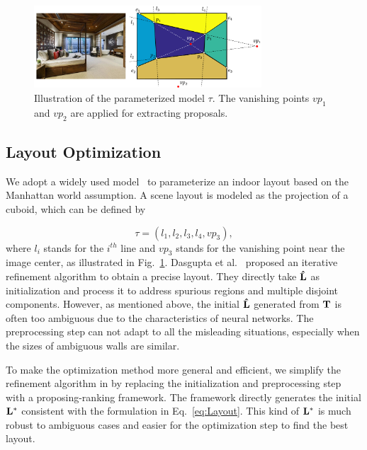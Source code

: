 \begin{figure}
	\centering
	\includegraphics[width=8.5cm]{figure/parameterization.png}
	\caption{ Illustration of the parameterized model $\tau$. The vanishing points $vp_1$ and $vp_2$ are applied for extracting proposals. }
	\label{fig:parameterization}
\end{figure}


\subsection{Layout Optimization}
\label{sec:optimization}
We adopt a widely used model~\cite{hedau2009recovering, wang2013discriminative, dasgupta2016delay, ren2016coarse} to parameterize an indoor layout based on the Manhattan world assumption. A scene layout is modeled as the projection of a cuboid, which can be defined by 

\begin{equation}
	\label{eq:Layout}
	\tau = (l_1, l_2, l_3, l_4, vp_3),
\end{equation}
%
where $l_{i}$ stands for the $i^{th}$ line and $vp_3$ stands for the vanishing point near the image center, as illustrated in Fig.~\ref{fig:parameterization}.
%
Dasgupta et al.~\cite{dasgupta2016delay} proposed an iterative refinement algorithm to obtain a precise layout. 
They directly take $\mathbf{\hat{L}}$ as initialization and process it to address spurious regions and multiple disjoint components. 
However, as mentioned above, the initial $\mathbf{\hat{L}}$ generated from $\mathbf{T}$ is often too ambiguous due to the characteristics of neural networks.
The preprocessing step can not adapt to all the misleading situations, especially when the sizes of ambiguous walls are similar. 

To make the optimization method more general and efficient, we simplify the refinement algorithm in \cite{dasgupta2016delay} by replacing the initialization and preprocessing step with a proposing-ranking framework. The framework directly generates the initial $\mathbf{L^*}$ consistent with the formulation in Eq.~\ref{eq:Layout}. This kind of $\mathbf{L^*}$ is much robust to ambiguous cases and easier for the optimization step to find the best layout.

